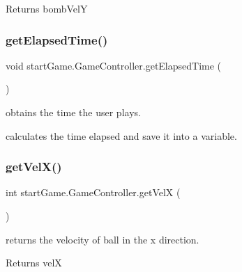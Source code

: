 \begin{DoxyReturn}{Returns}
bomb\+VelY 
\end{DoxyReturn}
\hypertarget{classstart_game_1_1_game_controller_a8b653d5dc322ed45691f1b50dcb16b05}{}\label{classstart_game_1_1_game_controller_a8b653d5dc322ed45691f1b50dcb16b05} 
\subsubsection{\texorpdfstring{get\+Elapsed\+Time()}{getElapsedTime()}}
{\footnotesize\ttfamily void start\+Game.\+Game\+Controller.\+get\+Elapsed\+Time (\begin{DoxyParamCaption}{ }\end{DoxyParamCaption})\hspace{0.3cm}{\ttfamily [private]}}



obtains the time the user plays. 

calculates the time elapsed and save it into a variable. \hypertarget{classstart_game_1_1_game_controller_a2170345005b5f2f453951dd7b4691e0f}{}\label{classstart_game_1_1_game_controller_a2170345005b5f2f453951dd7b4691e0f} 
\subsubsection{\texorpdfstring{get\+Vel\+X()}{getVelX()}}
{\footnotesize\ttfamily int start\+Game.\+Game\+Controller.\+get\+VelX (\begin{DoxyParamCaption}{ }\end{DoxyParamCaption})}



returns the velocity of ball in the x direction. 

\begin{DoxyReturn}{Returns}
velX 
\end{DoxyReturn}
\hypertarget{classstart_game_1_1_game_controller_a03bc4dfd9bc501924f18e7f9f49361db}{}\label{classstart_game_1_1_game_controller_a03bc4dfd9bc501924f18e7f9f49361db} 
